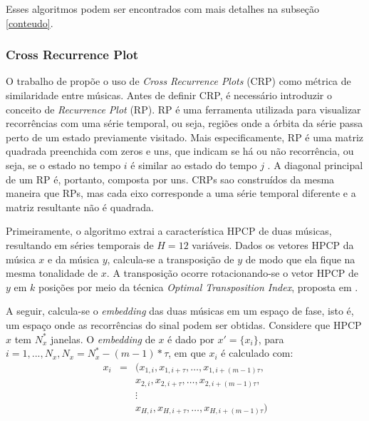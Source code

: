 Esses algoritmos podem ser encontrados com mais detalhes na subseção \ref{conteudo}.

\subsubsection{Cross Recurrence Plot}

O trabalho de  propõe o uso de \textit{Cross Recurrence Plots} (CRP) como métrica de similaridade entre músicas. Antes de definir CRP, é necessário introduzir o conceito de \textit{Recurrence Plot} (RP). RP é uma ferramenta utilizada para visualizar recorrências com uma série temporal, ou seja, regiões onde a órbita da série passa perto de um estado previamente visitado. Mais especificamente, RP é uma matriz quadrada preenchida com zeros e uns, que indicam se há ou não recorrência, ou seja, se o estado no tempo \({i}\) é similar ao estado do tempo \({j}\) \cite{eckmann1987, alligood1996}. A diagonal principal de um RP é, portanto, composta por uns. CRPs sao construídos da mesma maneira que RPs, mas cada eixo corresponde a uma série temporal diferente e a matriz resultante não é quadrada.

Primeiramente, o algoritmo extrai a característica HPCP \cite{gomez2006} de duas músicas, resultando em séries temporais de \({H = 12}\) variáveis. Dados os vetores HPCP da música \textbf{\({x}\)} e da música \textbf{\({y}\)}, calcula-se a transposição de \textbf{\({y}\)} de modo que ela fique na mesma tonalidade de \textbf{\({x}\)}. A transposição ocorre rotacionando-se o vetor HPCP de \textbf{\({y}\)} em \({k}\) posições por meio da técnica \textit{Optimal Transposition Index}, proposta em \cite{serra2009}.

A seguir, calcula-se o \textit{embedding} das duas músicas em um espaço de fase, isto é, um espaço onde as recorrências do sinal podem ser obtidas. Considere que  HPCP \textbf{\({x}\)} tem \({N_{x}^{*}}\) janelas. O \textit{embedding} de \textbf{\({x}\)} é dado por \({x' = \big\{x_{i}\big\}}\), para \({i = 1, ..., N_{x}, N_{x} = N_{x}^{*} - (m - 1)*\tau}\), em que \({x_{i}}\) é calculado com:
\begin{eqnarray} \label{embedding}
    x_{i} &=& (x_{1,i},x_{1,i+\tau}, \ldots, x_{1,i+(m-1)\tau}, \\
          & & x_{2,i},x_{2,i+\tau}, \ldots, x_{2,i+(m-1)\tau}, \nonumber \\
          & & \vdots \nonumber \\
          & & x_{H,i},x_{H,i+\tau}, \ldots, x_{H,i+(m-1)\tau}) \nonumber
\end{eqnarray}

